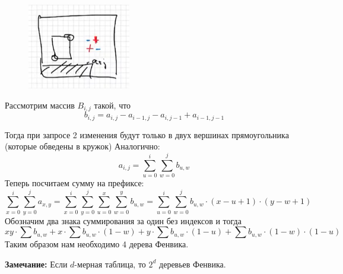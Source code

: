 \begin{figure}

\centering
\includegraphics[width=0.4\textwidth]{images/70-75_2dd}
\end{figure}
Рассмотрим массив $B_{i,j}$ такой, что
$$b_{i,j} = a_{i,j}-a_{i-1,j}-a_{i,j-1}+a_{i-1,j-1}$$
\par Тогда при запросе 2 изменения будут только в двух вершинах прямоугольника (которые обведены в кружок)
Аналогично:
$$a_{i,j}=\sum_{u=0}^{i}\sum_{w=0}^{j}b_{u,w}$$
\newline Теперь посчитаем сумму на префиксе:
$$\sum_{x=0}^{i}\sum_{y=0}^{j}a_{x,y}=\sum_{x=0}^{i}\sum_{y=0}^{j}\sum_{u=0}^{x}\sum_{w=0}^{y}b_{u,w} = \sum_{u=0}^{i}\sum_{w=0}^{j}b_{u,w}\cdot (x-u+1)\cdot(y-w+1)$$
Обозначим два знака суммирования за один без индексов и тогда
$$xy\cdot \sum b_{u,w}+x\cdot \sum b_{u,w}\cdot(1-w)+y\cdot \sum b_{u,w}\cdot(1-u)+\sum b_{u,w}\cdot(1-w)\cdot(1-u)$$
Таким образом нам необходимо 4 дерева Фенвика.
\\ \par \textbf{Замечание: } Если $d$-мерная таблица, то $2^d$ деревьев Фенвика.
\setcounter{section}{74}
